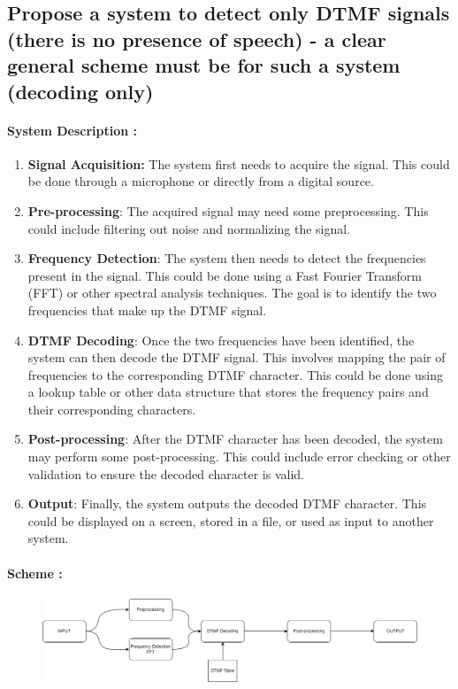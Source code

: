\documentclass[letterpaper, 12pt]{article}
\begin{document}
\subsection{Propose a system to detect only DTMF signals (there is no presence of speech) - a clear general scheme must be for such a system (decoding only)}

\paragraph{System Description :} 
\begin{enumerate}
    \item \textbf{Signal Acquisition:} The system first needs to acquire the signal. This could be done through a microphone or directly from a digital source.
    \item \textbf{Pre-processing}: The acquired signal may need some preprocessing. This could include filtering out noise and normalizing the signal.
    \item \textbf{Frequency Detection}: The system then needs to detect the frequencies present in the signal. This could be done using a Fast Fourier Transform (FFT) or other spectral analysis techniques. The goal is to identify the two frequencies that make up the DTMF signal.
    \item \textbf{DTMF Decoding}: Once the two frequencies have been identified, the system can then decode the DTMF signal. This involves mapping the pair of frequencies to the corresponding DTMF character. This could be done using a lookup table or other data structure that stores the frequency pairs and their corresponding characters. 
    \item \textbf{Post-processing}: After the DTMF character has been decoded, the system may perform some post-processing. This could include error checking or other validation to ensure the decoded character is valid.
    \item \textbf{Output}: Finally, the system outputs the decoded DTMF character. This could be displayed on a screen, stored in a file, or used as input to another system.
\end{enumerate}

\paragraph{Scheme :}
\begin{figure}[htbp]
    \centering
    \includegraphics[width=0.85\linewidth]{FINAL_ASSIGNMENT/A_Q_5.png}
    
    
\end{figure}
\end{document}
